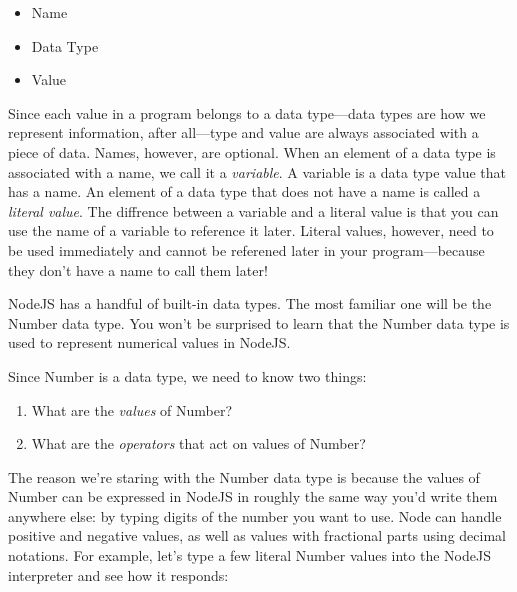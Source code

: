 \begin{itemize}
  \item Name
  \item Data Type
  \item Value
\end{itemize}

Since each value in a program belongs to a data type---data types are how we represent information, after all---type and value are always associated with a piece of data. Names, however, are optional. When an element of a data type is associated with a name, we call it a \emph{variable}. A variable is a data type value that has a name. An element of a data type that does not have a name is called a \emph{literal value}. The diffrence between a variable and a literal value is that you can use the name of a variable to reference it later. Literal values, however, need to be used immediately and cannot be referened later in your program---because they don't have a name to call them later!

NodeJS has a handful of built-in data types. The most familiar one will be the \textsf{Number} data type. You won't be surprised to learn that the \textsf{Number} data type is used to represent numerical values in NodeJS.

Since \textsf{Number} is a data type, we need to know two things:
\begin{enumerate}
  \item What are the \emph{values} of \textsf{Number}?
  \item What are the \emph{operators} that act on values of \textsf{Number}?
\end{enumerate}

The reason we're staring with the \textsf{Number} data type is because the values of \textsf{Number} can be expressed in NodeJS in roughly the same way you'd write them anywhere else: by typing digits of the number you want to use. Node can handle positive and negative values, as well as values with fractional parts using decimal notations. For example, let's type a few literal \textsf{Number} values into the NodeJS interpreter and see how it responds:

